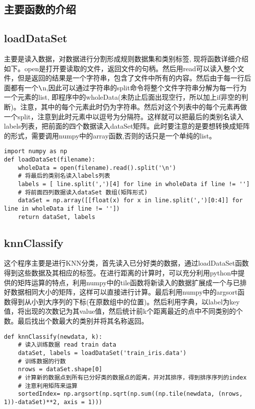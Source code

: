 \documentclass[a4paper, 1pt]{article}
\newcommand{\xiaosihao}{\fontsize{12pt}{\baselineskip}\selectfont}
\begin{document}
\begin{spacing}{1.0}
\section{\xiaosihao 主要函数的介绍}
\subsection{loadDataSet}
主要是读入数据，对数据进行分割形成规则数据集和类别标签, 现将函数详细介绍如下。open是打开要读取的文件，返回文件的句柄。然后用read可以读入整个文件，但是返回的结果是一个字符串，包含了文件中所有的内容。然后由于每一行后面都有一个$\verb|\|$n,因此可以通过字符串的split命令将整个文件字符串分解为每一行为一个元素的list, 即程序中的wholeData(未防止后面出现空行，所以加上if非空的判断)。注意，其中的每个元素此时仍为字符串。然后对这个列表中的每个元素再做一个split，注意到此时元素中以逗号为分隔符。这样就可以把最后的类别名读入labels列表，把前面的四个数据读入dataSet矩阵。此时要注意的是要想转换成矩阵的形式，需要调用numpy中的array函数,否则的话只是一个单纯的list。  
\begin{lstlisting}
import numpy as np
def loadDataSet(filename):
    wholeData = open(filename).read().split('\n')
    # 将最后的类别名读入labels列表
    labels = [ line.split(',')[4] for line in wholeData if line != '']
    # 将前面四列数据读入dataSet 数组(矩阵形式)
    dataSet = np.array([[float(x) for x in line.split(',')[0:4]] for line in wholeData if line != ''])
    return dataSet, labels
\end{lstlisting}

\subsection{knnClassify}
这个程序主要是进行KNN分类，首先读入已分好类的数据，通过loadDataSet函数得到这些数据及其相应的标签。在进行距离的计算时，可以充分利用python中提供的矩阵运算的特点，利用numpy中的tile函数将新读入的数据扩展成一个与已排好数据相同大小的矩阵，这样可以直接进行计算。最后利用numpy中的argsort函数得到从小到大序列的下标(在原数组中的位置)。然后利用字典，以label为key值，将出现的次数记为其value值，然后统计前k个距离最近的点中不同类别的个数。最后找出个数最大的类别并将其名称返回。
\begin{lstlisting}
def knnClassify(newdata, k):
    # 读入训练数据 read train data
    dataSet, labels = loadDataSet('train_iris.data')
    # 训练数据的行数
    nrows = dataSet.shape[0]
    # 计算新的数据点到所有已分好类的数据点的距离，并对其排序，得到排序序列的index
    # 注意利用矩阵来运算
    sortedIndex= np.argsort(np.sqrt(np.sum((np.tile(newdata, (nrows, 1))-dataSet)**2, axis = 1))) 


\end{lstlisting}
\end{spacing}
\end{document}
